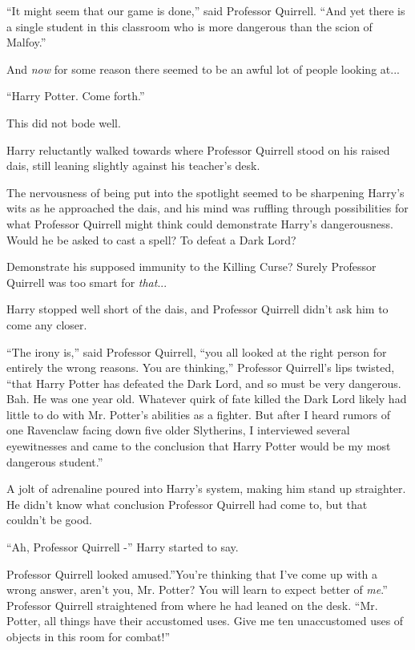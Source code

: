 ``It might seem that our game is done,'' said Professor Quirrell. ``And
yet there is a single student in this classroom who is more dangerous
than the scion of Malfoy.''

And \emph{now} for some reason there seemed to be an awful lot of people
looking at...

``Harry Potter. Come forth.''

This did not bode well.

Harry reluctantly walked towards where Professor Quirrell stood on his
raised dais, still leaning slightly against his teacher's desk.

The nervousness of being put into the spotlight seemed to be sharpening
Harry's wits as he approached the dais, and his mind was ruffling
through possibilities for what Professor Quirrell might think could
demonstrate Harry's dangerousness. Would he be asked to cast a spell? To
defeat a Dark Lord?

Demonstrate his supposed immunity to the Killing Curse? Surely Professor
Quirrell was too smart for \emph{that}...

Harry stopped well short of the dais, and Professor Quirrell didn't ask
him to come any closer.

``The irony is,'' said Professor Quirrell, ``you all looked at the right
person for entirely the wrong reasons. You are thinking,'' Professor
Quirrell's lips twisted, ``that Harry Potter has defeated the Dark Lord,
and so must be very dangerous. Bah. He was one year old. Whatever quirk
of fate killed the Dark Lord likely had little to do with Mr. Potter's
abilities as a fighter. But after I heard rumors of one Ravenclaw facing
down five older Slytherins, I interviewed several eyewitnesses and came
to the conclusion that Harry Potter would be my most dangerous
student.''

A jolt of adrenaline poured into Harry's system, making him stand up
straighter. He didn't know what conclusion Professor Quirrell had come
to, but that couldn't be good.

``Ah, Professor Quirrell -'' Harry started to say.

Professor Quirrell looked amused.''You're thinking that I've come up
with a wrong answer, aren't you, Mr. Potter? You will learn to expect
better of \emph{me}.'' Professor Quirrell straightened from where he had
leaned on the desk. ``Mr. Potter, all things have their accustomed uses.
Give me ten unaccustomed uses of objects in this room for combat!''

